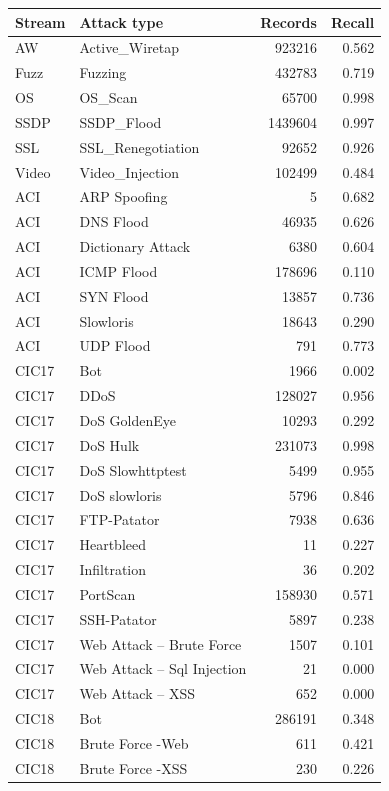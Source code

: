 \begin{table}[ht]\centering\footnotesize\setlength{\tabcolsep}{3.5pt}
\begin{tabular}{llrr}
\hline
\textbf{Stream} & \textbf{Attack type} & \textbf{Records} & \textbf{Recall}\\
\hline
AW & Active\_Wiretap & 923216 & 0.562\\
Fuzz & Fuzzing & 432783 & 0.719\\
OS & OS\_Scan & 65700 & 0.998\\
SSDP & SSDP\_Flood & 1439604 & 0.997\\
SSL & SSL\_Renegotiation & 92652 & 0.926\\
Video & Video\_Injection & 102499 & 0.484\\
ACI & ARP Spoofing & 5 & 0.682\\
ACI & DNS Flood & 46935 & 0.626\\
ACI & Dictionary Attack & 6380 & 0.604\\
ACI & ICMP Flood & 178696 & 0.110\\
ACI & SYN Flood & 13857 & 0.736\\
ACI & Slowloris & 18643 & 0.290\\
ACI & UDP Flood & 791 & 0.773\\
CIC17 & Bot & 1966 & 0.002\\
CIC17 & DDoS & 128027 & 0.956\\
CIC17 & DoS GoldenEye & 10293 & 0.292\\
CIC17 & DoS Hulk & 231073 & 0.998\\
CIC17 & DoS Slowhttptest & 5499 & 0.955\\
CIC17 & DoS slowloris & 5796 & 0.846\\
CIC17 & FTP-Patator & 7938 & 0.636\\
CIC17 & Heartbleed & 11 & 0.227\\
CIC17 & Infiltration & 36 & 0.202\\
CIC17 & PortScan & 158930 & 0.571\\
CIC17 & SSH-Patator & 5897 & 0.238\\
CIC17 & Web Attack -- Brute Force & 1507 & 0.101\\
CIC17 & Web Attack -- Sql Injection & 21 & 0.000\\
CIC17 & Web Attack -- XSS & 652 & 0.000\\
CIC18 & Bot & 286191 & 0.348\\
CIC18 & Brute Force -Web & 611 & 0.421\\
CIC18 & Brute Force -XSS & 230 & 0.226\\

\end{tabular}
\end{table}
